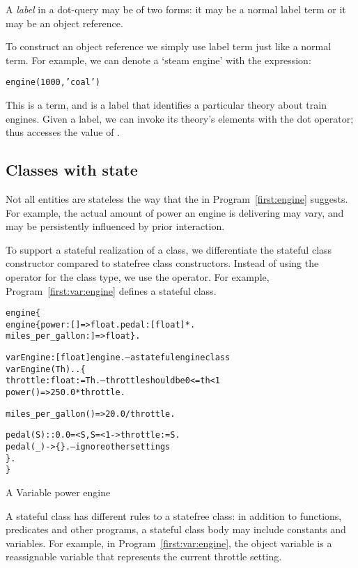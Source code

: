A \emph{label} in a dot-query may be of two forms: it may be a normal label term or it may be an object reference.

To construct an  object reference we simply use  label term just like a normal term. For example, we can denote a `steam engine' with the expression:
\begin{alltt}
engine(1000,'coal')
\end{alltt}
This is a term, and is a label that identifies a particular theory about train engines. Given a label, we can invoke its theory's elements with the dot operator; thus  accesses the  value of .

\subsection{Classes with state}
Not all entities are stateless the way that the  in Program~\ref{first:engine} suggests. For example, the actual amount of power an engine is delivering may vary, and may be persistently influenced by prior interaction.

To support a stateful realization of a class, we differentiate the stateful class constructor compared to statefree class constructors. Instead of using the \conarrow{} operator for the class type, we use the \sconarrow{} operator. For example, Program~\vref{first:var:engine} defines a stateful  class.
\begin{program}[bt]
\vspace{0.5ex}
\begin{alltt}
engine\{
  engine \impl \{ power:[]=>float. pedal:[float]*. 
              miles_per_gallon:]=>float \}.

  varEngine:[float]\sconarrow{}engine.   -- a stateful engine class
  varEngine(Th)..\{
    throttle:float := Th.    -- throttle should be 0<=th<1
    power()=>250.0*throttle.

    miles_per_gallon()=>20.0/throttle.
  
    pedal(S)::0.0=<S,S=<1 -> throttle:=S.
    pedal(_)->\{\}.            -- ignore other settings
  \}.
\}
\end{alltt}
\caption{A Variable power engine}
\vspace{-2ex}
\label{first:var:engine}
\end{program}

A stateful class has different rules to a statefree class: in addition to functions, predicates and other programs, a stateful class body may include constants and variables. For example, in Program~\ref{first:var:engine}, the object variable  is a reassignable variable that represents the current throttle setting.

